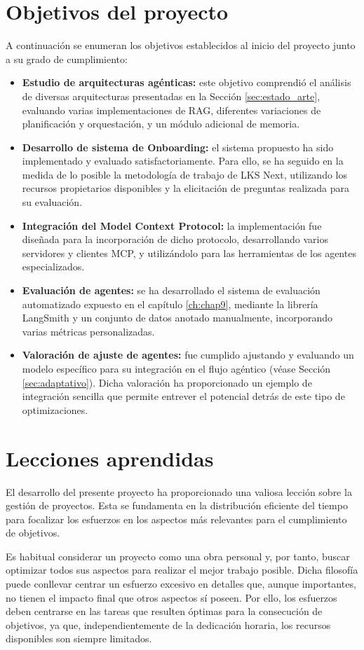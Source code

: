 \section{Objetivos del proyecto}
A continuación se enumeran los objetivos establecidos al inicio del proyecto junto a su grado de cumplimiento:
\begin{itemize}
\item\textbf{Estudio de arquitecturas agénticas: }este objetivo comprendió el análisis de diversas arquitecturas presentadas en la Sección \ref{sec:estado_arte}, evaluando varias implementaciones de RAG, diferentes variaciones de planificación y orquestación, y un módulo adicional de memoria.
\item\textbf{Desarrollo de sistema de Onboarding: }el sistema propuesto ha sido implementado y evaluado satisfactoriamente. Para ello, se ha seguido en la medida de lo posible la metodología de trabajo de LKS Next, utilizando los recursos propietarios disponibles y la elicitación de preguntas realizada para su evaluación.
\item\textbf{Integración del Model Context Protocol: }la implementación fue diseñada para la incorporación de dicho protocolo, desarrollando varios servidores y clientes MCP, y utilizándolo para las herramientas de los agentes especializados.
\item\textbf{Evaluación de agentes: }se ha desarrollado el sistema de evaluación automatizado expuesto en el capítulo \ref{ch:chap9}, mediante la librería LangSmith y un conjunto de datos anotado manualmente, incorporando varias métricas personalizadas.
\item\textbf{Valoración de ajuste de agentes: }fue cumplido ajustando y evaluando un modelo específico para su integración en el flujo agéntico (véase Sección \ref{sec:adaptativo}). Dicha valoración ha proporcionado un ejemplo de integración sencilla que permite entrever el potencial detrás de este tipo de optimizaciones.
\end{itemize}

\section{Lecciones aprendidas}
El desarrollo del presente proyecto ha proporcionado una valiosa lección sobre la gestión de proyectos. Esta se fundamenta en la distribución eficiente del tiempo para focalizar los esfuerzos en los aspectos más relevantes para el cumplimiento de objetivos.

Es habitual considerar un proyecto como una obra personal y, por tanto, buscar optimizar todos sus aspectos para realizar el mejor trabajo posible. Dicha filosofía puede conllevar centrar un esfuerzo excesivo en detalles que, aunque importantes, no tienen el impacto final que otros aspectos sí poseen. Por ello, los esfuerzos deben centrarse en las tareas que resulten óptimas para la consecución de objetivos, ya que, independientemente de la dedicación horaria, los recursos disponibles son siempre limitados.

